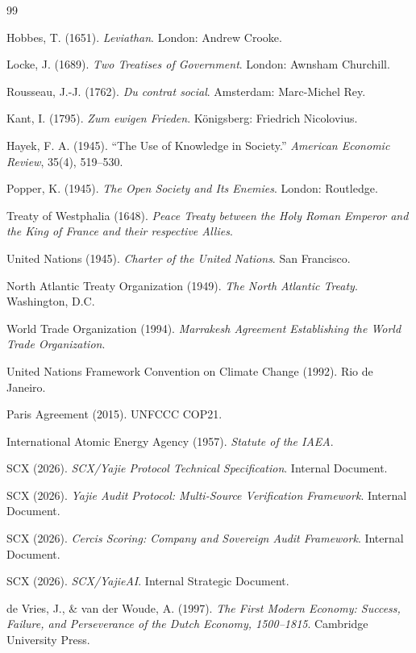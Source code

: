 \documentclass[12pt,a4paper]{article}
\theoremstyle{remark}
\begin{document}
\newpage
\begin{thebibliography}{99}

 Hobbes, T. (1651). \textit{Leviathan}. London: Andrew Crooke.

 Locke, J. (1689). \textit{Two Treatises of Government}. London: Awnsham Churchill.

 Rousseau, J.-J. (1762). \textit{Du contrat social}. Amsterdam: Marc-Michel Rey.

 Kant, I. (1795). \textit{Zum ewigen Frieden}. Königsberg: Friedrich Nicolovius.

 Hayek, F. A. (1945). ``The Use of Knowledge in Society.'' \textit{American Economic Review}, 35(4), 519–530.

 Popper, K. (1945). \textit{The Open Society and Its Enemies}. London: Routledge.

 Treaty of Westphalia (1648). \textit{Peace Treaty between the Holy Roman Emperor and the King of France and their respective Allies}.

 United Nations (1945). \textit{Charter of the United Nations}. San Francisco.

 North Atlantic Treaty Organization (1949). \textit{The North Atlantic Treaty}. Washington, D.C.

 World Trade Organization (1994). \textit{Marrakesh Agreement Establishing the World Trade Organization}.

 United Nations Framework Convention on Climate Change (1992). Rio de Janeiro.

 Paris Agreement (2015). UNFCCC COP21.

 International Atomic Energy Agency (1957). \textit{Statute of the IAEA}.

 SCX (2026). \textit{SCX/Yajie Protocol Technical Specification}. Internal Document.

 SCX (2026). \textit{Yajie Audit Protocol: Multi-Source Verification Framework}. Internal Document.

 SCX (2026). \textit{Cercis Scoring: Company and Sovereign Audit Framework}. Internal Document.

 SCX (2026). \textit{SCX/YajieAI}. Internal Strategic Document.

 de Vries, J., \& van der Woude, A. (1997). \textit{The First Modern Economy: Success, Failure, and Perseverance of the Dutch Economy, 1500–1815}. Cambridge University Press.


\end{thebibliography}
\end{document}
